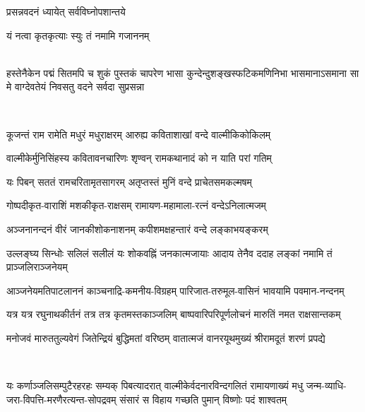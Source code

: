 

{प्रसन्नवदनं ध्यायेत् सर्वविघ्नोपशान्तये}

{यं नत्वा कृतकृत्याः स्युः तं नमामि गजाननम्}

\mbox{}\\
{हस्तेनैकेन पद्मं सितमपि च शुकं पुस्तकं चापरेण}
{भासा कुन्देन्दुशङ्खस्फटिकमणिनिभा भासमानाऽसमाना}
{सा मे वाग्देवतेयं निवसतु वदने सर्वदा सुप्रसन्ना}

\mbox{}\\

\twolineshloka
{कूजन्तं राम रामेति मधुरं मधुराक्षरम्}
{आरुह्य कविताशाखां वन्दे वाल्मीकिकोकिलम्}

\twolineshloka
{वाल्मीकेर्मुनिसिंहस्य कवितावनचारिणः}
{शृण्वन् रामकथानादं को न याति परां गतिम्}

\twolineshloka
{यः पिबन् सततं रामचरितामृतसागरम्}
{अतृप्तस्तं मुनिं वन्दे प्राचेतसमकल्मषम्}

\clearpage
\resetShloka
{}

\twolineshloka
{गोष्पदीकृत-वाराशिं मशकीकृत-राक्षसम्}
{रामायण-महामाला-रत्नं वन्देऽनिलात्मजम्}

\twolineshloka
{अञ्जनानन्दनं वीरं जानकीशोकनाशनम्}
{कपीशमक्षहन्तारं वन्दे लङ्काभयङ्करम्}

\twolineshloka
{उल्लङ्घ्य सिन्धोः सलिलं सलीलं यः शोकवह्निं जनकात्मजायाः}
{आदाय तेनैव ददाह लङ्कां नमामि तं प्राञ्जलिराञ्जनेयम्}

\twolineshloka
{आञ्जनेयमतिपाटलाननं काञ्चनाद्रि-कमनीय-विग्रहम्}
{पारिजात-तरुमूल-वासिनं भावयामि पवमान-नन्दनम्}

\twolineshloka
{यत्र यत्र रघुनाथकीर्तनं तत्र तत्र कृतमस्तकाञ्जलिम्}
{बाष्पवारिपरिपूर्णलोचनं मारुतिं नमत राक्षसान्तकम्}

\twolineshloka
{मनोजवं मारुततुल्यवेगं जितेन्द्रियं बुद्धिमतां वरिष्ठम्}
{वातात्मजं वानरयूथमुख्यं श्रीरामदूतं शरणं प्रपद्ये}

\mbox{}\\
\resetShloka
{}

\fourlineindentedshloka
{यः कर्णाञ्जलिसम्पुटैरहरहः सम्यक् पिबत्यादरात्}
{वाल्मीकेर्वदनारविन्दगलितं रामायणाख्यं मधु}
{जन्म-व्याधि-जरा-विपत्ति-मरणैरत्यन्त-सोपद्रवम्}
{संसारं स विहाय गच्छति पुमान् विष्णोः पदं शाश्वतम्}

